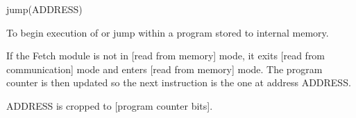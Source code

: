 

\format
jump(ADDRESS)

\purpose

To begin execution of or jump within a program stored to internal memory.

\description

If the Fetch module is not in [read from memory] mode, it exits [read from communication] mode and enters [read from memory] mode.
The program counter is then updated so the next instruction is the one at address ADDRESS.

\notes

ADDRESS is cropped to [program counter bits].
